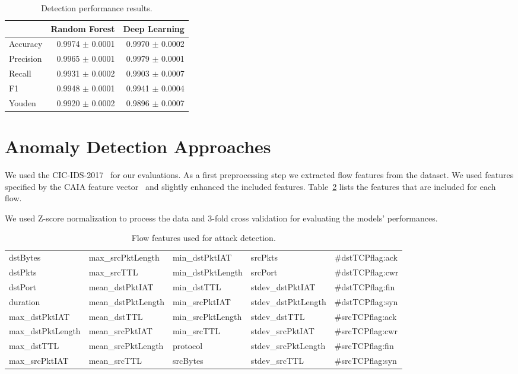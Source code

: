 \documentclass[10pt,sigconf,letterpaper]{acmart}
\begin{document}
\begin{table}[b]
\caption{Detection performance results.} \label{tab:performance_results}
\begin{tabular}{l r r} \toprule
& Random Forest & Deep Learning \\ \midrule
Accuracy	&	0.9974 $\pm$ 0.0001	&	0.9970 $\pm$ 0.0002	\\
Precision	&	0.9965 $\pm$ 0.0001	&	0.9979 $\pm$ 0.0001	\\
Recall	&	0.9931 $\pm$ 0.0002	&	0.9903 $\pm$ 0.0007	\\
F1	&	0.9948 $\pm$ 0.0001	&	0.9941 $\pm$ 0.0004	\\
Youden	&	0.9920 $\pm$ 0.0002	&	0.9896 $\pm$ 0.0007	\\
\bottomrule
\end{tabular}
\end{table}

\section{Anomaly Detection Approaches} \label{sec:ml_approaches}
We used the CIC-IDS-2017~\cite{Sharafaldin2018} for our evaluations. As a first preprocessing step we extracted flow features from the dataset. We used features specified by the CAIA feature vector~\cite{Williams2006} and slightly enhanced the included features. Table~\ref{tab:features} lists the features that are included for each flow.

We used Z-score normalization to process the data and 3-fold cross validation for evaluating the models' performances.

\begin{table}
\renewcommand*{\arraystretch}{1.2} %
\caption{Flow features used for attack detection.}
\label{tab:features}
\begin{tabular}{l l l l l} \toprule
dstBytes	&	max\_srcPktLength	&	min\_dstPktIAT	&	srcPkts	&	\#dstTCPflag:ack	\\
dstPkts	&	max\_srcTTL	&	min\_dstPktLength	&	srcPort	&	\#dstTCPflag:cwr	\\
dstPort	&	mean\_dstPktIAT	&	min\_dstTTL	&	stdev\_dstPktIAT	&	\#dstTCPflag:fin	\\
duration	&	mean\_dstPktLength	&	min\_srcPktIAT	&	stdev\_dstPktLength	&	\#dstTCPflag:syn	\\
max\_dstPktIAT	&	mean\_dstTTL	&	min\_srcPktLength	&	stdev\_dstTTL	&	\#srcTCPflag:ack	\\
max\_dstPktLength	&	mean\_srcPktIAT	&	min\_srcTTL	&	stdev\_srcPktIAT	&	\#srcTCPflag:cwr	\\
max\_dstTTL	&	mean\_srcPktLength	&	protocol	&	stdev\_srcPktLength	&	\#srcTCPflag:fin	\\
max\_srcPktIAT	&	mean\_srcTTL	&	srcBytes	&	stdev\_srcTTL	&	\#srcTCPflag:syn	\\
 \bottomrule
\end{tabular}
\end{table}
 
\end{document}
